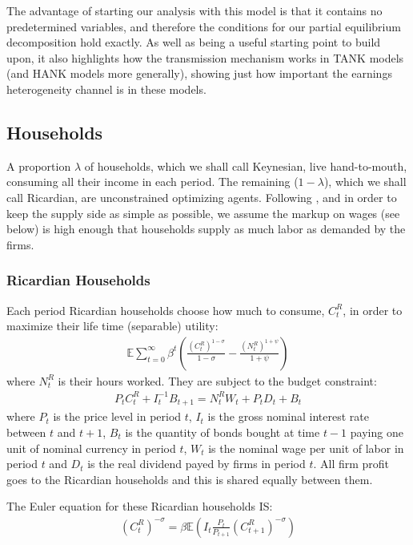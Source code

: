 \documentclass[titlepage]{\econtex}\newcommand{\texname}{ConsumptionHeterogeneity}
\begin{document}
The advantage of starting our analysis with this model is that it contains no predetermined variables, and therefore the conditions for our partial equilibrium decomposition hold exactly. As well as being a useful starting point to build upon, it also highlights how the transmission mechanism works in TANK models (and HANK models more generally), showing just how important the earnings heterogeneity channel is in these models.

\subsection{Households}
A proportion $\lambda$ of households, which we shall call Keynesian, live hand-to-mouth, consuming all their income in each period. The remaining ($1-\lambda$), which we shall call Ricardian, are unconstrained optimizing agents. Following \cite{dgHANKTANK}, and in order to keep the supply side as simple as possible, we assume the markup on wages (see below) is high enough that households supply as much labor as demanded by the firms.

\subsubsection{Ricardian Households}
Each period Ricardian households choose how much to consume, $C^R_t$, in order to maximize their life time (separable) utility:
\begin{align*}
\mathbb{E}\sum_{t=0}^{\infty}\beta^t \left(\frac{\left(C^R_t\right)^{1-\sigma}}{1-\sigma} - \frac{\left(N^R_t\right)^{1+\psi}}{1+\psi}\right)
\end{align*}
where $N^R_t$ is their hours worked. They are subject to the budget constraint:
\begin{align*}
P_t C^R_t + I_{t}^{-1}B_{t+1} =  N^R_t W_t + P_t D_t + B_t
\end{align*}
where $P_t$ is the price level in period $t$, $I_t$ is the gross nominal interest rate between $t$ and $t+1$, $B_t$ is the quantity of bonds bought at time $t-1$ paying one unit of nominal currency in period $t$, $W_t$ is the nominal wage per unit of labor in period $t$ and $D_t$ is the real dividend payed by firms in period $t$. All firm profit goes to the Ricardian households and this is shared equally between them.

The Euler equation for these Ricardian households IS:
\begin{align}
\left(C^R_t\right)^{-\sigma} = \beta \mathbb{E}\left(I_t\frac{P_{t}}{P_{t+1}} \left(C^R_{t+1}\right)^{-\sigma}\right)	\label{euler_R}
\end{align}
\end{document}
